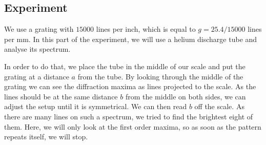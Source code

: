 \subsection{Experiment}
We use a grating with $15000$ lines per inch, which is equal to $g = 25.4/15000$ lines per mm.
In this part of the experiment, we will use a helium discharge tube and analyse its spectrum.

In order to do that, we place the tube in the middle of our scale and put the grating at a distance $a$ from the tube.
By looking through the middle of the grating we can see the diffraction maxima as lines projected to the scale.
As the lines should be at the same distance $b$ from the middle on both sides, we can adjust the setup until it is symmetrical.
We can then read $b$ off the scale.
As there are many lines on such a spectrum, we tried to find the brightest eight of them.
Here, we will only look at the first order maxima, so as soon as the pattern repeats itself, we will stop.